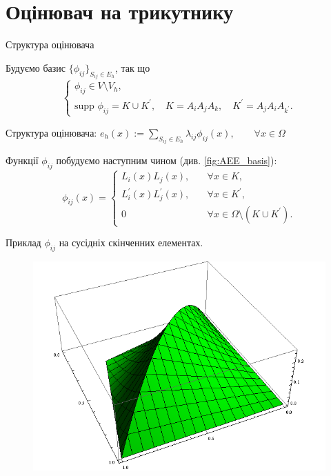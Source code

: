 
\section{Оцінювач на трикутнику}
\frame{\sectionpage}

\begin{frame}{Структура оцінювача}

	Будуємо базис $\lbrace \phi_{ij} \rbrace_{S_{ij} \in E_h}$, так що
%
	\begin{equation}\label{eq:basis_properties}
		\begin{cases}
			\phi_{ij} \in V \setminus V_h, \\
			\text{supp } \phi_{ij} = K \cup K^\prime, \quad K = A_iA_jA_k, \quad K^\prime = A_jA_iA_{k^\prime}.
		\end{cases}
	\end{equation}

	Структура оцінювача:
	$e_h(x) := \sum \limits_{S_{ij} \in E_h} \lambda_{ij} \phi_{ij}(x), \qquad \forall x \in \Omega$

	Функції $\phi_{ij}$ побудуємо наступним чином (див. \autoref{fig:AEE_basis}):
	\begin{equation}
		\phi_{ij}(x) =
		\begin{cases}
			L_i(x)L_j(x), &\quad \forall x \in K ,\\
			L_i^\prime(x)L_j^\prime(x), &\quad \forall x \in K^\prime ,\\
			0 &\quad \forall x \in \Omega \setminus (K \cup K^\prime).
		\end{cases}
	\end{equation}

\end{frame}

\begin{frame}{Приклад $\phi_{ij}$ на сусідніх скінченних елементах.}

		\begin{figure}[H]
			\centering
		    \includegraphics[height=0.75\textheight]{images/basis}
		    \label{fig:AEE_basis}
		\end{figure}

\end{frame}


